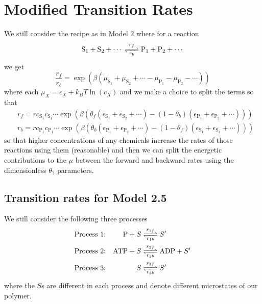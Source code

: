 \documentclass[11pt]{article}
\begin{document}
\section{Modified Transition Rates}\label{sec:modtransr}
We still consider the recipe as in Model 2 where for a reaction
\begin{equation}
	\ce{S_1 + S_2 + $\cdots$ <=>[$r_f$][$r_b$] P_1 + P_2 + $\cdots$}
\end{equation}
we get
\begin{equation}
	\frac{r_f}{r_b} = \exp(\beta(\mu_{\text{S}_1} + \mu_{\text{S}_2} + \cdots - \mu_{\text{P}_1} - \mu_{\text{P}_2} - \cdots))
\end{equation}
where each $\mu_X = \epsilon_X + \si{k_B}T\ln(c_X)$ and we make a choice to split the terms so that
\begin{align}
	 & r_f = r c_{\text{S}_1}c_{\text{S}_1}\cdots \exp(\beta(\theta_f(\epsilon_{\text{S}_1} + \epsilon_{\text{S}_2} + \cdots) - (1-\theta_b)(\epsilon_{\text{P}_1} + \epsilon_{\text{P}_2} + \cdots))) \\
	 & r_b = r c_{\text{P}_1}c_{\text{P}_1}\cdots \exp(\beta(\theta_b(\epsilon_{\text{P}_1} + \epsilon_{\text{P}_2} + \cdots) - (1-\theta_f)(\epsilon_{\text{S}_1} + \epsilon_{\text{S}_2} + \cdots)))
\end{align}
so that higher concentrations of any chemicals increase the rates of those reactions using them (reasonable) and then we can split the energetic contributions to the $\mu$ between the forward and backward rates using the dimensionless $\theta_?$ parameters.

\subsection{Transition rates for Model 2.5}
We still consider the following three processes
\begin{align}
	\text{Process 1:} &  & \ce{P + $S$   & <=>[$r_{1f}$][$r_{1b}$] $S'$}       \\
	\text{Process 2:} &  & \ce{ATP + $S$ & <=>[$r_{2f}$][$r_{2b}$] ADP + $S'$} \\
	\text{Process 3:} &  & \ce{$S$       & <=>[$r_{3f}$][$r_{3b}$] $S'$}
\end{align}
where the $S$s are different in each process and denote different microstates of our polymer.
\end{document}
